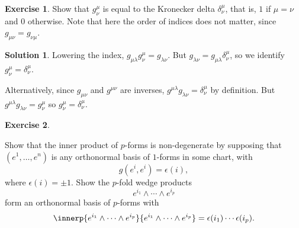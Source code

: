 \documentclass[11pt, a4paper]{article}
\theoremstyle{definition}
\newtheorem{ex}{Exercise}[part]
\newtheorem{sol}{Solution}[part]
\begin{document}
\begin{ex}

Show that $g^\mu_\nu$ is equal to the Kronecker delta $\delta^\mu_\nu$, that is, $1$ if $\mu = \nu$ and $0$ otherwise. Note that here the order of indices does not matter, since $g_{\mu\nu} = g_{\nu\mu}$.

\end{ex}

\begin{sol}

Lowering the index, $g_{\mu\lambda}g^\mu_\nu = g_{\lambda\nu}$.
But $g_{\lambda\nu} = g_{\mu\lambda}\delta^\mu_\nu$, so we identify $g^\mu_\nu = \delta^\mu_\nu$.

Alternatively, since $g_{\mu\nu}$ and $g^{\mu\nu}$ are inverses, $g^{\mu\lambda} g_{\lambda\nu} = \delta^\mu_\nu$ by definition.
But $g^{\mu\lambda} g_{\lambda\nu} = g^\mu_\nu$ so $g^\mu_\nu = \delta^\mu_\nu$.

\end{sol}

\begin{ex}\label{ex:innerproductpforms}

Show that the inner product of $p$-forms is non-degenerate by supposing that $(e^1, \ldots, e^n)$ is any orthonormal basis of $1$-forms in some chart, with
\[
    g(e^i, e^i) = \epsilon(i),
\]
where $\epsilon(i) = \pm 1$. Show the $p$-fold wedge products
\[
    e^{i_1} \wedge \cdots \wedge e^{i_p}
\]
form an orthonormal basis of $p$-forms with
\[
    \innerp{e^{i_1} \wedge \cdots \wedge e^{i_p}}
           {e^{i_1} \wedge \cdots \wedge e^{i_p}}
        = \epsilon(i_1) \cdots \epsilon(i_p).
\]

\end{ex}
\end{document}
